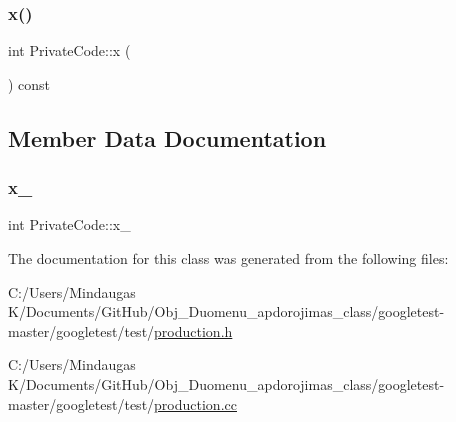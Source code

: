 \subsubsection{\texorpdfstring{x()}{x()}\hspace{0.1cm}{\footnotesize\ttfamily [3/3]}}
{\footnotesize\ttfamily int Private\+Code\+::x (\begin{DoxyParamCaption}{ }\end{DoxyParamCaption}) const\hspace{0.3cm}{\ttfamily [inline]}}



\subsection{Member Data Documentation}
\mbox{\label{class_private_code_a3590a614d8c76fa34fa4cea6f340c37f}} 
\subsubsection{\texorpdfstring{x\_}{x\_}}
{\footnotesize\ttfamily int Private\+Code\+::x\+\_\+\hspace{0.3cm}{\ttfamily [private]}}



The documentation for this class was generated from the following files\+:\begin{DoxyCompactItemize}
\item 
C\+:/\+Users/\+Mindaugas K/\+Documents/\+Git\+Hub/\+Obj\+\_\+\+Duomenu\+\_\+apdorojimas\+\_\+class/googletest-\/master/googletest/test/\mbox{\hyperlink{googletest-master_2googletest_2test_2production_8h}{production.\+h}}\item 
C\+:/\+Users/\+Mindaugas K/\+Documents/\+Git\+Hub/\+Obj\+\_\+\+Duomenu\+\_\+apdorojimas\+\_\+class/googletest-\/master/googletest/test/\mbox{\hyperlink{googletest-master_2googletest_2test_2production_8cc}{production.\+cc}}\end{DoxyCompactItemize}
